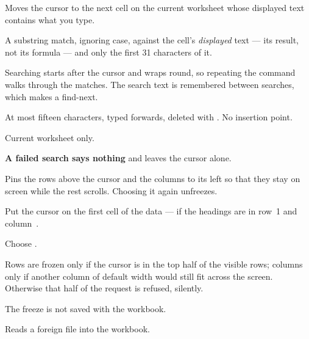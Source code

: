 
Moves the cursor to the next cell on the current worksheet whose displayed text
contains what you type.

\begin{ccsteps}
\item A substring match, ignoring case, against the cell's \emph{displayed}
text --- its result, not its formula --- and only the first 31 characters of it.
\item Searching starts after the cursor and wraps round, so repeating the
command walks through the matches. The search text is remembered between
searches, which makes   a find-next.
\item At most fifteen characters, typed forwards, deleted with
. No insertion point.
\item Current worksheet only.
\item \textbf{A failed search says nothing} and leaves the cursor alone.
\end{ccsteps}


Pins the rows above the cursor and the columns to its left so that they stay on
screen while the rest scrolls. Choosing it again unfreezes.

\begin{ccprocedure}[]
\item Put the cursor on the first cell of the data ---  if the
headings are in row~1 and column~.
\item Choose .
\end{ccprocedure}

\begin{ccsteps}
\item Rows are frozen only if the cursor is in the top half of the visible
rows; columns only if another column of default width would still fit across
the screen. Otherwise that half of the request is refused, silently.
\item The freeze is not saved with the workbook.
\end{ccsteps}


Reads a foreign file into the workbook.

